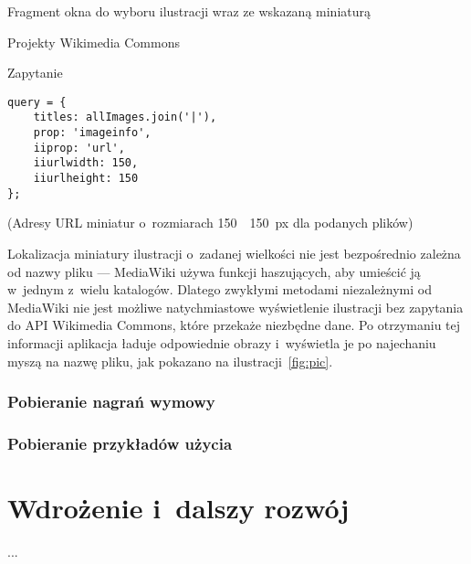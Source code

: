 \begin{illustration}
	\caption{Fragment okna do wyboru ilustracji wraz ze wskazaną miniaturą}
	\label{fig:pic}
\end{illustration}

\begin{opis}
\item[Projekty] Wikimedia Commons
\item[Zapytanie]
\begin{verbatim}
query = {
    titles: allImages.join('|'),
    prop: 'imageinfo',
    iiprop: 'url',
    iiurlwidth: 150,
    iiurlheight: 150
};
\end{verbatim}
(Adresy URL miniatur o~rozmiarach 150~\texttimes~150~px dla podanych plików)
\end{opis}

Lokalizacja miniatury ilustracji o~zadanej wielkości nie jest bezpośrednio zależna od nazwy pliku --- MediaWiki używa funkcji haszujących, aby umieścić ją w~jednym z~wielu katalogów. Dlatego zwykłymi metodami niezależnymi od MediaWiki nie jest możliwe natychmiastowe wyświetlenie ilustracji bez zapytania do API Wikimedia Commons, które przekaże niezbędne dane. Po otrzymaniu tej informacji aplikacja ładuje odpowiednie obrazy i~wyświetla je po najechaniu myszą na nazwę pliku, jak pokazano na ilustracji~\ref{fig:pic}.

\subsubsection{Pobieranie nagrań wymowy}


\subsubsection{Pobieranie przykładów użycia}

\section{Wdrożenie i~dalszy rozwój}
\label{sec:impl-deploy}

...
